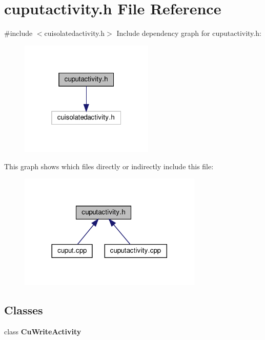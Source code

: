 \section{cuputactivity.\+h File Reference}
\label{cuputactivity_8h}
{\ttfamily \#include $<$cuisolatedactivity.\+h$>$}\newline
Include dependency graph for cuputactivity.\+h\+:\nopagebreak
\begin{figure}[H]
\begin{center}
\leavevmode
\includegraphics[width=181pt]{cuputactivity_8h__incl}
\end{center}
\end{figure}
This graph shows which files directly or indirectly include this file\+:\nopagebreak
\begin{figure}[H]
\begin{center}
\leavevmode
\includegraphics[width=248pt]{cuputactivity_8h__dep__incl}
\end{center}
\end{figure}
\subsection*{Classes}
\begin{DoxyCompactItemize}
\item 
class \textbf{ Cu\+Write\+Activity}
\end{DoxyCompactItemize}
